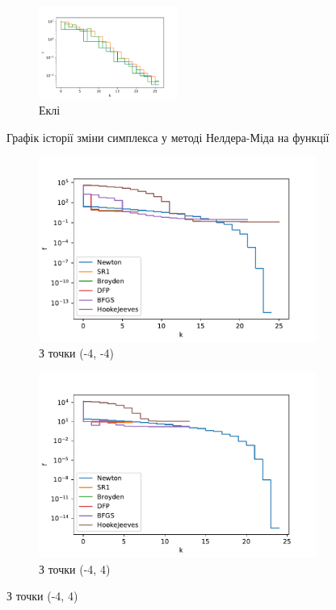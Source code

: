 \begin{figure}[h!]
\begin{subfigure}{\textwidth}
        \centering
        \includegraphics[width=0.5\textwidth, trim=0cm 0cm 1.2cm 1cm, clip]{assets/NelderMead/ackley_steps.pdf}
        \caption{Еклі}
    \end{subfigure}
    \caption{Графік історії зміни симплекса у методі Нелдера-Міда на функції}
\end{figure}

\begin{figure}[h!]
    \begin{subfigure}{0.5\textwidth}
        \includegraphics[width=\textwidth, trim=0cm 0cm 1.2cm 1cm, clip]{assets/descent_steps/rosenbrock_steps_0.pdf}
        \caption{З точки (-4, -4)}
    \end{subfigure}
    \begin{subfigure}{0.5\textwidth}
        \includegraphics[width=\textwidth, trim=0cm 0cm 1.2cm 1cm, clip]{assets/descent_steps/rosenbrock_steps_1.pdf}
        \caption{З точки (-4, 4)}
    \end{subfigure}
\end{figure}
